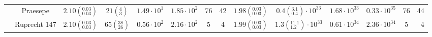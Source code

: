 \begin{tabular}{lccccccccccccr}
          & Praesepe &  $2.10\left(^{0.03}_{0.03}\right)$ &          $21\left(^{4}_{3}\right)$ &    $1.49\cdot 10^{1}$ &    $1.85\cdot 10^{2}$ &                 76 &                 42 &  $1.98\left(^{0.03}_{0.03}\right)$ &   $0.4\left(^{3.1}_{0.4}\right)\cdot 10^{33}$ &       $1.68\cdot 10^{33}$ &       $0.33\cdot 10^{35}$ &                   76 &                   44 \\
          & Ruprecht 147 &  $2.10\left(^{0.03}_{0.03}\right)$ &        $65\left(^{38}_{26}\right)$ &    $0.56\cdot 10^{2}$ &    $2.16\cdot 10^{2}$ &                  5 &                  4 &  $1.99\left(^{0.03}_{0.03}\right)$ &  $1.3\left(^{11.1}_{1.2}\right)\cdot 10^{33}$ &       $0.61\cdot 10^{34}$ &       $2.36\cdot 10^{34}$ &                    5 &                    4 \\
\hline

\end{tabular}

